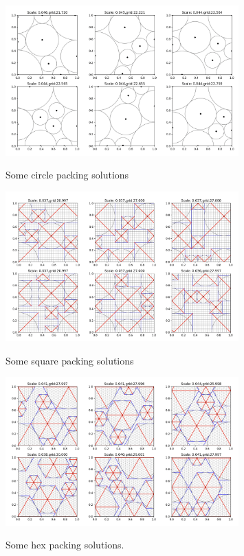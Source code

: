 \documentclass[12pt]{article}
\begin{document}
\begin{figure}
    \centering
    \includegraphics[width=0.8\textwidth]{circle packings2.png}\label{fig:circles}\caption{Some circle packing solutions}
\end{figure}
\begin{figure}
    \centering
    \includegraphics[width=0.8\textwidth]{square packings 2.png}\label{fig:squares}\caption{Some square packing solutions}
\end{figure}
\begin{figure}
    \centering
    \includegraphics[width=0.8\textwidth]{hex packings 2.png}\label{fig:hexagons}\caption{Some hex packing solutions.}
\end{figure}
\end{document}
